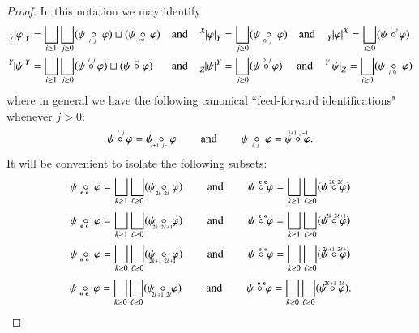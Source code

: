 \documentclass{amsart}
\def\tn{\textnormal}
\def\hsp{\hspace{.3in}}
\def\bfe{{\bf e}}
\def\bfo{{\bf o}}
\newcommand{\feeddd}[3]{{\tensor*[^{#2}_{\color{white}{!}}]{{|#1|}}{^{#3}}}}%
\newcommand{\feeddc}[3]{{\tensor*[^{#2}]{{|#1|}}{_{#3}}}}
\newcommand{\feedcd}[3]{{\tensor*[_{#2}]{{|#1|}}{^{#3}}}}
\newcommand{\feedcc}[3]{{\tensor*[^{\color{white}{!}}_{#2}]{{|#1|}}{_{#3}}}}
\theoremstyle{remark}
\theoremstyle{definition}
\begin{document}
\begin{proof}
In this notation we may identify 
\begin{align*}
 \feedcc{\varphi}{Y}{Y}
 &=\bigsqcup_{i\ge1}\bigsqcup_{j\ge0}(\psi\;\underaccent{\,\ i\ j}{\circ}\;\varphi)\sqcup(\psi\,\underaccent{\;\ \infty}{\circ}\,\varphi)
 \quad\tn{and}\quad
 \feeddc{\varphi}{X}{Y}=\bigsqcup_{j\ge0}(\psi\;\underaccent{\,\ 0\ j}{\circ}\;\varphi)
 \quad\tn{and}\quad
 \feedcd{\varphi}{Y}{X}=\bigsqcup_{i\ge0}(\psi\;\accentset{\,i\ 0}{\circ}\;\varphi)\\
 \feeddd{\psi}{Y}{Y}
 &=\bigsqcup_{i\ge1}\bigsqcup_{j\ge0}(\psi\;\accentset{\,i\ j}{\circ}\;\varphi)\sqcup(\psi\;\accentset{\infty}{\circ}\;\varphi)
 \quad\quad\!\!\tn{and}\quad
 \feedcd{\psi}{Z}{Y}=\bigsqcup_{j\ge0}(\psi\;\accentset{\,0\ j}{\circ}\;\varphi)
 \ \quad\tn{and}\quad
 \feeddc{\psi}{Y}{Z}=\bigsqcup_{i\ge0}(\psi\;\underaccent{\,\ i\ 0}{\circ}\;\varphi)
\end{align*}
where in general we have the following canonical ``feed-forward identifications" whenever $j>0$:
\[\psi\;\accentset{\,i\ j}{\circ}\;\varphi=\psi\;\underaccent{\,\,\ i+1\ j-1}{\circ}\;\varphi\hsp\tn{and}\hsp\psi\;\underaccent{\,\ i\ j}{\circ}\;\varphi=\psi\;\accentset{\,i+1\ j-1}{\circ}\;\varphi.\]
It will be convenient to isolate the following subsets:
\[\psi\;\underaccent{\,\ \bfe\ \bfe}{\circ}\;\varphi=\bigsqcup_{k\ge1}\bigsqcup_{\ell\ge0}(\psi\;\underaccent{\,\ 2k\ 2\ell}{\circ}\;\varphi)\hsp\tn{and}\hsp\psi\;\accentset{\,\ \bfe\ \bfe}{\circ}\;\varphi=\bigsqcup_{k\ge1}\bigsqcup_{\ell\ge0}(\psi\;\accentset{\,\ 2k\ 2\ell}{\circ}\;\varphi)\]
\[\psi\;\underaccent{\,\ \bfe\ \bfo}{\circ}\;\varphi=\bigsqcup_{k\ge1}\bigsqcup_{\ell\ge0}(\psi\;\underaccent{\,\ 2k\ 2\ell+1}{\circ}\;\varphi)\hsp\tn{and}\hsp\psi\;\accentset{\,\ \bfe\ \bfo}{\circ}\;\varphi=\bigsqcup_{k\ge1}\bigsqcup_{\ell\ge0}(\psi\;\accentset{\,\ 2k\ 2\ell+1}{\circ}\;\varphi)\]
\[\psi\;\underaccent{\,\ \bfo\ \bfo}{\circ}\;\varphi=\bigsqcup_{k\ge0}\bigsqcup_{\ell\ge0}(\psi\;\underaccent{\,\ 2k+1\ 2\ell+1}{\circ}\;\varphi)\hsp\tn{and}\hsp\psi\;\accentset{\,\ \bfo\ \bfo}{\circ}\;\varphi=\bigsqcup_{k\ge0}\bigsqcup_{\ell\ge0}(\psi\;\accentset{\,\ 2k+1\ 2\ell+1}{\circ}\;\varphi)\]
\[\psi\;\underaccent{\,\ \bfo\ \bfe}{\circ}\;\varphi=\bigsqcup_{k\ge0}\bigsqcup_{\ell\ge0}(\psi\;\underaccent{\,\ 2k+1\ 2\ell}{\circ}\;\varphi)\hsp\tn{and}\hsp\psi\;\accentset{\,\ \bfo\ \bfe}{\circ}\;\varphi=\bigsqcup_{k\ge0}\bigsqcup_{\ell\ge0}(\psi\;\accentset{\,\ 2k+1\ 2\ell}{\circ}\;\varphi).\]


\end{proof}
\end{document}

